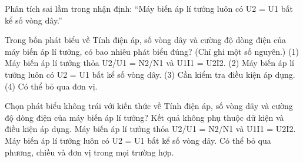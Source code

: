 \begin{bt}
Phân tích sai lầm trong nhận định: “Máy biến áp lí tưởng luôn có U2 = U1 bất kể số vòng dây.”
\end{bt}

\begin{ex}
Trong bốn phát biểu về Tính điện áp, số vòng dây và cường độ dòng điện của máy biến áp lí tưởng, có bao nhiêu phát biểu đúng? (Chỉ ghi một số nguyên.) (1) Máy biến áp lí tưởng thỏa U2/U1 = N2/N1 và U1I1 = U2I2. (2) Máy biến áp lí tưởng luôn có U2 = U1 bất kể số vòng dây. (3) Cần kiểm tra điều kiện áp dụng. (4) Có thể bỏ qua đơn vị.
\end{ex}

\begin{ex}
Chọn phát biểu không trái với kiến thức về Tính điện áp, số vòng dây và cường độ dòng điện của máy biến áp lí tưởng?
\choice
{Kết quả không phụ thuộc dữ kiện và điều kiện áp dụng.}
{\True Máy biến áp lí tưởng thỏa U2/U1 = N2/N1 và U1I1 = U2I2.}
{Máy biến áp lí tưởng luôn có U2 = U1 bất kể số vòng dây.}
{Có thể bỏ qua phương, chiều và đơn vị trong mọi trường hợp.}
\end{ex}

